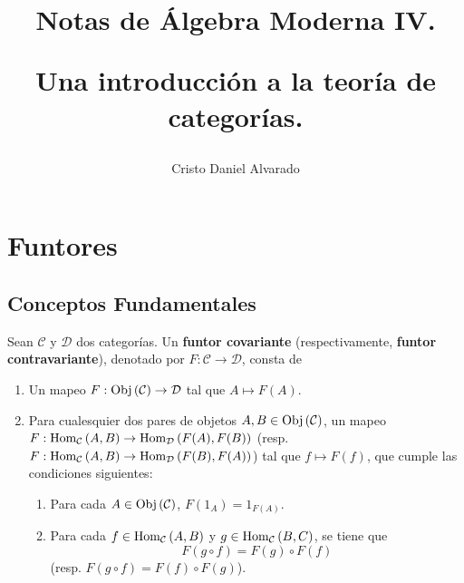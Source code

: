 \documentclass[12pt]{report}
\theoremstyle{largebreak}
\newcommand\cf[3]{\ensuremath{#1:#2\rightarrow#3}}
\newcommand{\Obj}[1]{\ensuremath{\textup{Obj}\left(#1\right)}}
\newcommand{\Hom}[3]{\ensuremath{\textup{Hom}_{#1}\left(#2,#3\right)}}
\begin{document}
    \setlength{\parskip}{5pt} %
    \setlength{\parindent}{12pt} %
    \title{Notas de Álgebra Moderna IV.
    
    Una introducción a la teoría de categorías.}
    \author{Cristo Daniel Alvarado}
    \maketitle

    \tableofcontents %

    \setcounter{chapter}{2} %
    
    \chapter{Funtores}

    \section{Conceptos Fundamentales}
    
    \begin{mydef}
        Sean $\mathcal{C}$ y $\mathcal{D}$ dos categorías. Un \textbf{funtor covariante} (respectivamente, \textbf{funtor contravariante}), denotado por $\cf{F}{\mathcal{C}}{\mathcal{D}}$, consta de
        \begin{enumerate}
            \item Un mapeo $\cf{F}{\Obj{\mathcal{C}}}{\mathcal{D}}$ tal que $A\mapsto F(A)$.
            \item Para cualesquier dos pares de objetos $A,B\in\Obj{\mathcal{C}}$, un mapeo $\cf{F}{\Hom{\mathcal{C}}{A}{B}}{\Hom{\mathcal{D}}{F(A)}{F(B)}}$ (resp. $\cf{F}{\Hom{\mathcal{C}}{A}{B}}{\Hom{\mathcal{D}}{F(B)}{F(A)}}$) tal que $f\mapsto F(f)$, que cumple las condiciones siguientes:
            \begin{enumerate}
                \item Para cada $A\in\Obj{\mathcal{C}}$, $F(1_A)=1_{F(A)}$.
                \item Para cada $f\in\Hom{\mathcal{C}}{A}{B}$ y $g\in\Hom{\mathcal{C}}{B}{C}$, se tiene que
                \begin{equation*}
                    F(g\circ f)=F(g)\circ F(f)
                \end{equation*}
                (resp. $F(g\circ f)=F(f)\circ F(g)$).
            \end{enumerate}
        \end{enumerate}
    \end{mydef}
\end{document}
